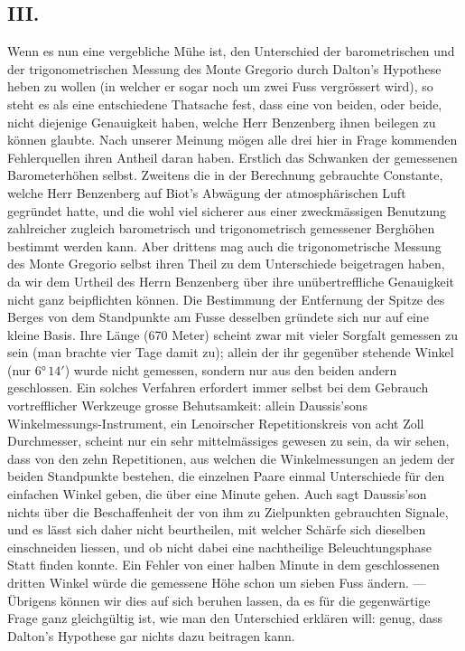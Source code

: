 \documentclass[fontsize=10pt,paper=a5,pagesize=auto]{scrbook}
\newcommand{\origpage}[1]{\marginpar{\footnotesize\textit{S. #1}}}
\begin{document}
\subsection*{III.}
\origpage{591}
Wenn es nun eine vergebliche Mühe ist, den Unterschied der barometrischen und der trigonometrischen Messung des Monte Gregorio durch Dalton's Hypothese heben zu wollen (in welcher er sogar noch um zwei Fuss vergrössert wird), so steht es als eine entschiedene Thatsache fest, dass eine von beiden, oder beide, nicht diejenige Genauigkeit haben, welche Herr Benzenberg ihnen beilegen zu können glaubte. Nach unserer Meinung mögen alle drei hier in Frage kommenden Fehlerquellen ihren Antheil daran haben. Erstlich das Schwanken der gemessenen Barometerhöhen selbst. Zweitens die in der Berechnung gebrauchte Constante, welche Herr Benzenberg auf Biot's Abwägung der atmosphärischen Luft gegründet hatte, und die wohl viel sicherer aus einer zweckmässigen Benutzung zahlreicher zugleich barometrisch und trigonometrisch gemessener Berghöhen bestimmt werden kann. Aber drittens mag auch die trigonometrische Messung des Monte Gregorio selbst ihren Theil zu dem Unterschiede beigetragen haben, da wir dem Urtheil des Herrn Benzenberg über ihre unübertreffliche Genauigkeit nicht ganz beipflichten können. Die Bestimmung der Entfernung der Spitze des Berges von dem Standpunkte am Fusse desselben gründete sich nur auf eine kleine Basis. Ihre Länge (670 Meter) scheint zwar mit vieler Sorgfalt gemessen zu sein (man brachte vier Tage damit zu); allein der ihr gegenüber stehende Winkel (nur $6°\,14'$) wurde nicht gemessen, sondern nur aus den beiden andern geschlossen. Ein solches Verfahren erfordert immer selbst bei dem Gebrauch vortrefflicher Werkzeuge grosse Behutsamkeit: allein Daussis'sons Winkelmessungs-Instrument, ein Lenoirscher Repetitionskreis von acht Zoll Durchmesser, scheint nur ein sehr mittelmässiges gewesen zu sein, da wir sehen, dass von den zehn Repetitionen, aus welchen die Winkelmessungen an jedem der beiden Standpunkte bestehen, die einzelnen Paare einmal Unterschiede für den einfachen Winkel geben, die über eine Minute gehen. Auch sagt Daussis'son nichts über die Beschaffenheit der von ihm zu Zielpunkten gebrauchten Signale, und es lässt sich daher nicht beurtheilen, mit welcher Schärfe sich dieselben einschneiden liessen, und ob nicht dabei eine nachtheilige Beleuchtungsphase Statt finden konnte. Ein Fehler von einer halben Minute in dem geschlossenen dritten Winkel würde die gemessene Höhe schon um sieben Fuss ändern. --- Übrigens können wir dies auf sich beruhen lassen, da es für die gegenwärtige Frage ganz gleichgültig ist, wie man den Unterschied erklären will: genug, dass Dalton's Hypothese gar nichts dazu beitragen kann.
\end{document}
